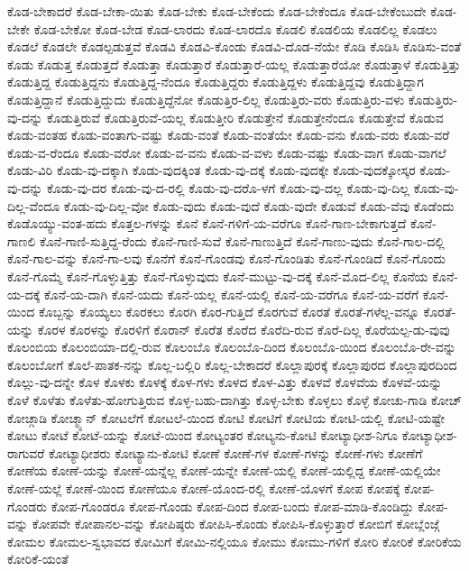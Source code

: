 {ಕೊಡ-ಬೇಕಾದರೆ
ಕೊಡ-ಬೇಕಾ-ಯಿತು
ಕೊಡ-ಬೇಕು
ಕೊಡ-ಬೇಕೆಂದು
ಕೊಡ-ಬೇಕೆಂದೂ
ಕೊಡ-ಬೇಕೆಂಬುದೇ
ಕೊಡ-ಬೇಕೇ
ಕೊಡ-ಬೇಕೋ
ಕೊಡ-ಬೇಡ
ಕೊಡ-ಲಾರದು
ಕೊಡ-ಲಾರದೊ
ಕೊಡಲಿ
ಕೊಡಲಿಯ
ಕೊಡಲಿಲ್ಲ
ಕೊಡಲು
ಕೊಡಲೆ
ಕೊಡಲೇ
ಕೊಡಲ್ಪಡುತ್ತವೆ
ಕೊಡವಿ
ಕೊಡವಿ-ಕೊಂಡು
ಕೊಡವಿ-ದೊಡ-ನೆಯೇ
ಕೊಡಿ
ಕೊಡಿಸಿ
ಕೊಡಿಸು-ವಂತೆ
ಕೊಡು
ಕೊಡುತ್ತ
ಕೊಡುತ್ತದೆ
ಕೊಡುತ್ತಾ
ಕೊಡುತ್ತಾರೆ
ಕೊಡುತ್ತಾರೆ-ಯಲ್ಲ
ಕೊಡುತ್ತಾರೆಯೋ
ಕೊಡುತ್ತಾಳೆ
ಕೊಡುತ್ತಿತ್ತು
ಕೊಡುತ್ತಿದ್ದ
ಕೊಡುತ್ತಿದ್ದನು
ಕೊಡುತ್ತಿದ್ದ-ನೆಂದೂ
ಕೊಡುತ್ತಿದ್ದರು
ಕೊಡುತ್ತಿದ್ದಳು
ಕೊಡುತ್ತಿದ್ದವು
ಕೊಡುತ್ತಿದ್ದಾಗ
ಕೊಡುತ್ತಿದ್ದಾನೆ
ಕೊಡುತ್ತಿದ್ದುದು
ಕೊಡುತ್ತಿದ್ದೆನೋ
ಕೊಡುತ್ತಿರ-ಲಿಲ್ಲ
ಕೊಡುತ್ತಿರು-ವರು
ಕೊಡುತ್ತಿರು-ವಳು
ಕೊಡುತ್ತಿರು-ವು-ದನ್ನು
ಕೊಡುತ್ತಿರುವೆ
ಕೊಡುತ್ತಿರುವೆ-ಯಲ್ಲ
ಕೊಡುತ್ತೀರಿ
ಕೊಡುತ್ತೇನೆ
ಕೊಡುತ್ತೇನೆಂದೂ
ಕೊಡುತ್ತೇವೆ
ಕೊಡುವ
ಕೊಡು-ವಂತಹ
ಕೊಡು-ವಂತಾಗು-ವಷ್ಟು
ಕೊಡು-ವಂತೆ
ಕೊಡು-ವಂತೆಯೇ
ಕೊಡು-ವನು
ಕೊಡು-ವರು
ಕೊಡು-ವರೆ
ಕೊಡು-ವ-ರೆಂದೂ
ಕೊಡು-ವರೋ
ಕೊಡು-ವ-ವನು
ಕೊಡು-ವ-ವಳು
ಕೊಡು-ವಷ್ಟು
ಕೊಡು-ವಾಗ
ಕೊಡು-ವಾಗಲೆ
ಕೊಡು-ವಿರಿ
ಕೊಡು-ವು-ದಕ್ಕಾಗಿ
ಕೊಡು-ವುದಕ್ಕಿಂತ
ಕೊಡು-ವು-ದಕ್ಕೆ
ಕೊಡು-ವುದಕ್ಕೇ
ಕೊಡು-ವುದಕ್ಕೋಸ್ಕರ
ಕೊಡು-ವು-ದನ್ನು
ಕೊಡು-ವು-ದರ
ಕೊಡು-ವು-ದ-ರಲ್ಲಿ
ಕೊಡು-ವು-ದರೊ-ಳಗೆ
ಕೊಡು-ವು-ದಲ್ಲ
ಕೊಡು-ವು-ದಿಲ್ಲ
ಕೊಡು-ವು-ದಿಲ್ಲ-ವೆಂದೂ
ಕೊಡು-ವು-ದಿಲ್ಲ-ವೋ
ಕೊಡು-ವುದು
ಕೊಡು-ವುದೆ
ಕೊಡು-ವುದೇ
ಕೊಡುವೆ
ಕೊಡು-ವೆವು
ಕೊಡೆಂದು
ಕೊಡೊಯ್ಯು-ವಂತ-ಹದು
ಕೊತ್ತಲ-ಗಳನ್ನು
ಕೊನೆ
ಕೊನೆ-ಗಳಿಗೆ-ಯ-ವರೆಗೂ
ಕೊನೆ-ಗಾಣ-ಬೇಕಾಗುತ್ತದೆ
ಕೊನೆ-ಗಾಣಲಿ
ಕೊನೆ-ಗಾಣಿ-ಸುತ್ತಿದ್ದ-ರೆಂದು
ಕೊನೆ-ಗಾಣಿ-ಸುವೆ
ಕೊನೆ-ಗಾಣುತ್ತಿದೆ
ಕೊನೆ-ಗಾಣು-ವುದು
ಕೊನೆ-ಗಾಲ-ದಲ್ಲಿ
ಕೊನೆ-ಗಾಲ-ವನ್ನು
ಕೊನೆ-ಗಾ-ಲವು
ಕೊನೆಗೆ
ಕೊನೆ-ಗೊಂಡವು
ಕೊನೆ-ಗೊಂಡಿತು
ಕೊನೆ-ಗೊಂಡಿದೆ
ಕೊನೆ-ಗೊಂದು
ಕೊನೆ-ಗೊಮ್ಮೆ
ಕೊನೆ-ಗೊಳ್ಳುತ್ತಿತ್ತು
ಕೊನೆ-ಗೊಳ್ಳುವುದು
ಕೊನೆ-ಮುಟ್ಟು-ವು-ದಕ್ಕೆ
ಕೊನೆ-ಮೊದ-ಲಿಲ್ಲ
ಕೊನೆಯ
ಕೊನೆ-ಯ-ದಕ್ಕೆ
ಕೊನೆ-ಯ-ದಾಗಿ
ಕೊನೆ-ಯದು
ಕೊನೆ-ಯಲ್ಲ
ಕೊನೆ-ಯಲ್ಲಿ
ಕೊನೆ-ಯ-ವರೆಗೂ
ಕೊನೆ-ಯ-ವರೆಗೆ
ಕೊನೆ-ಯಿಂದ
ಕೊಬ್ಬನ್ನು
ಕೊಯ್ಯಲು
ಕೊರಕಲು
ಕೊರಗಿ
ಕೊರ-ಗುತ್ತಿದೆ
ಕೊರಗುವೆ
ಕೊರತೆ
ಕೊರತೆ-ಗಳೆಲ್ಲ-ವನ್ನೂ
ಕೊರತೆ-ಯನ್ನು
ಕೊರಳ
ಕೊರಳನ್ನು
ಕೊರಳಿಗೆ
ಕೊರಾನ್
ಕೊರೆತ
ಕೊರೆದ
ಕೊರೆದಿ-ರುವ
ಕೊರೆ-ದಿಲ್ಲ
ಕೊರೆಯಲ್ಪ-ಡು-ವುವು
ಕೊಲಂಬಿಯ
ಕೊಲಂಬಿಯಾ-ದಲ್ಲಿ-ರುವ
ಕೊಲಂಬೊ
ಕೊಲಂಬೊ-ದಿಂದ
ಕೊಲಂಬೊ-ಯಿಂದ
ಕೊಲಂಬೊ-ರೇ-ವನ್ನು
ಕೊಲಂಬೋಗೆ
ಕೊಲೆ-ಪಾತಕ-ನನ್ನು
ಕೊಲ್ಲ-ಬಲ್ಲಿರಿ
ಕೊಲ್ಲ-ಬೇಕಾದರೆ
ಕೊಲ್ಲಾಪುರಕ್ಕೆ
ಕೊಲ್ಲಾಪುರದ
ಕೊಲ್ಲಾಪುರದಿಂದ
ಕೊಲ್ಲು-ವು-ದನ್ನೇ
ಕೊಳ
ಕೊಳಕು
ಕೊಳಕ್ಕೆ
ಕೊಳ-ಗಳು
ಕೊಳದ
ಕೊಳ-ವಿತ್ತು
ಕೊಳವೆ
ಕೊಳವೆಯ
ಕೊಳವೆ-ಯನ್ನು
ಕೊಳೆ
ಕೊಳೆತು
ಕೊಳೆತು-ಹೋಗುತ್ತಿರುವ
ಕೊಳ್ಳ-ಬಹು-ದಾಗಿತ್ತು
ಕೊಳ್ಳ-ಬೇಕು
ಕೊಳ್ಳಲು
ಕೊಳ್ಳೆ
ಕೋಚು-ಗಾಡಿ
ಕೋಚ್
ಕೋಚ್ಗಾಡಿ
ಕೋಚ್ಮ್ಯಾನ್
ಕೋಟಲೆಗೆ
ಕೋಟಲೆ-ಯಿಂದ
ಕೋಟಿ
ಕೋಟಿಗೆ
ಕೋಟಿಯ
ಕೋಟಿ-ಯಲ್ಲಿ
ಕೋಟಿ-ಯಷ್ಟೇ
ಕೋಟು
ಕೋಟೆ
ಕೋಟೆ-ಯನ್ನು
ಕೋಟೆ-ಯಿಂದ
ಕೋಟ್ಯಂತರ
ಕೋಟ್ಯನು-ಕೋಟಿ
ಕೋಟ್ಯಾಧೀಶ-ನಿಗೂ
ಕೋಟ್ಯಾಧೀಶ-ರಾಗುವರೆ
ಕೋಟ್ಯಾಧೀಶರು
ಕೋಟ್ಯಾನು-ಕೋಟಿ
ಕೋಣೆ
ಕೋಣೆ-ಗಳ
ಕೋಣೆ-ಗಳನ್ನು
ಕೋಣೆ-ಗಳು
ಕೋಣೆಗೆ
ಕೋಣೆಯ
ಕೋಣೆ-ಯನ್ನು
ಕೋಣೆ-ಯನ್ನೆಲ್ಲ
ಕೋಣೆ-ಯನ್ನೇ
ಕೋಣೆ-ಯಲ್ಲಿ
ಕೋಣೆ-ಯಲ್ಲಿದ್ದ
ಕೋಣೆ-ಯಲ್ಲಿಯೇ
ಕೋಣೆ-ಯಲ್ಲೆ
ಕೋಣೆ-ಯಿಂದ
ಕೋಣೆಯೂ
ಕೋಣೆ-ಯೊಂದ-ರಲ್ಲಿ
ಕೋಣೆ-ಯೊಳಗೆ
ಕೋಪ
ಕೋಪಕ್ಕೆ
ಕೋಪ-ಗೊಂಡರು
ಕೋಪ-ಗೊಂಡರೂ
ಕೋಪ-ಗೊಂಡು
ಕೋಪ-ದಿಂದ
ಕೋಪ-ಬಂದು
ಕೋಪ-ಮಾಡಿ-ಕೊಂಡಿದ್ದು
ಕೋಪ-ವನ್ನು
ಕೋಪವೇ
ಕೋಪಾನಲ-ವನ್ನು
ಕೋಪಿಷ್ಠರು
ಕೋಪಿಸಿ-ಕೊಂಡು
ಕೋಪಿಸಿ-ಕೊಳ್ಳುತ್ತಾರೆ
ಕೋಬಿಗೆ
ಕೋಬ್ಲೆಂಜ್ಗೆ
ಕೋಮಲ
ಕೋಮಲ-ಸ್ವಭಾವದ
ಕೋಮಿಗೆ
ಕೋಮಿ-ನಲ್ಲಿಯೂ
ಕೋಮು
ಕೋಮು-ಗಳಿಗೆ
ಕೋರಿ
ಕೋರಿಕೆ
ಕೋರಿಕೆಯ
ಕೋರಿಕೆ-ಯಂತೆ
}
